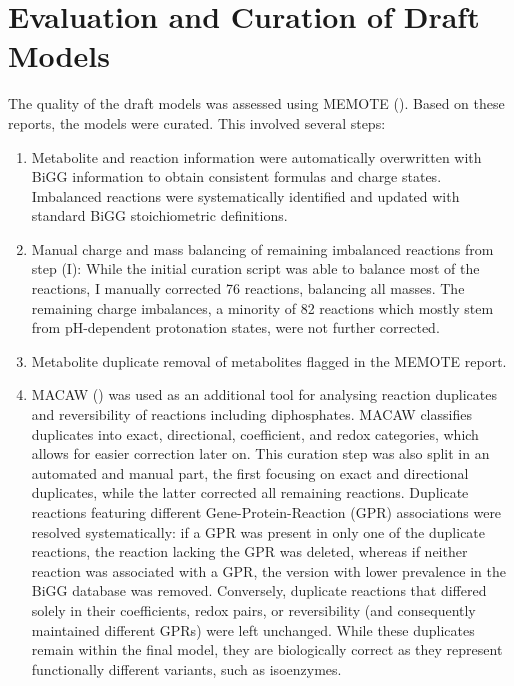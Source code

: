 \section{Evaluation and Curation of Draft Models}
The quality of the draft models was assessed using MEMOTE (\cite{lieven_memote_2020}). Based on these reports, the models were curated. This involved several steps: 
\begin{enumerate}
    \item Metabolite and reaction information were automatically overwritten with BiGG information to obtain consistent formulas and charge states. Imbalanced reactions were systematically identified and updated with standard BiGG stoichiometric definitions.
    \item Manual charge and mass balancing of remaining imbalanced reactions from step (I): While the initial curation script was able to balance most of the reactions, I manually corrected 76 reactions, balancing all masses. The remaining charge imbalances, a minority of 82 reactions which mostly stem from pH-dependent protonation states, were not further corrected. 
    \item Metabolite duplicate removal of metabolites flagged in the MEMOTE report. 
    \item MACAW (\cite{moyer_macaw_2025}) was used as an additional tool for analysing reaction duplicates and reversibility of reactions including diphosphates. MACAW classifies duplicates into exact, directional, coefficient, and redox categories, which allows for easier correction later on. This curation step was also split in an automated and manual part, the first focusing on exact and directional duplicates, while the latter corrected all remaining reactions. Duplicate reactions featuring different Gene-Protein-Reaction (GPR) associations were resolved systematically: if a GPR was present in only one of the duplicate reactions, the reaction lacking the GPR was deleted, whereas if neither reaction was associated with a GPR, the version with lower prevalence in the BiGG database was removed. Conversely, duplicate reactions that differed solely in their coefficients, redox pairs, or reversibility (and consequently maintained different GPRs) were left unchanged. While these duplicates remain within the final model, they are biologically correct as they represent functionally different variants, such as isoenzymes. 

\end{enumerate}
